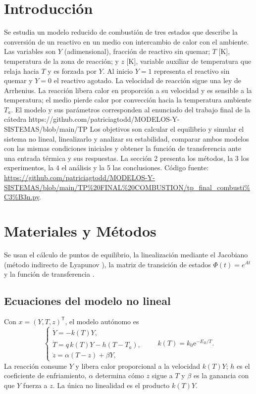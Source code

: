 \documentclass[11pt,a4paper]{article}
\newcommand{\e}{\mathrm{e}}
\begin{document}
\section{Introducción}
Se estudia un modelo reducido de combustión de tres estados que describe la conversión de un reactivo en un medio con intercambio de calor con el ambiente. Las variables son $Y$ (adimensional), fracción de reactivo sin quemar; $T$ [K], temperatura de la zona de reacción; y $z$ [K], variable auxiliar de temperatura que relaja hacia $T$ y es forzada por $Y$. Al inicio $Y=1$ representa el reactivo sin quemar y $Y=0$ el reactivo agotado.
La velocidad de reacción sigue una ley de Arrhenius. La reacción libera calor en proporción a su velocidad y es sensible a la temperatura; el medio pierde calor por convección hacia la temperatura ambiente $T_a$. El modelo y sus parámetros corresponden al enunciado del trabajo final de la cátedra https://github.com/patriciagtodd/MODELOS-Y-SISTEMAS/blob/main/TP%
Los objetivos son calcular el equilibrio y simular el sistema no lineal, linealizarlo y analizar su estabilidad, comparar ambos modelos con las mismas condiciones iniciales y obtener la función de transferencia ante una entrada térmica y sus respuestas. La sección 2 presenta los métodos, la 3 los experimentos, la 4 el análisis y la 5 las conclusiones. Código fuente: \url{https://github.com/patriciagtodd/MODELOS-Y-SISTEMAS/blob/main/TP\%20FINAL\%20COMBUSTION/tp_final_combusti\%C3\%B3n.py}.
\section{Materiales y Métodos}
Se usan el cálculo de puntos de equilibrio, la linealización mediante el Jacobiano (método indirecto de Lyapunov \cite{Khalil}), la matriz de transición de estados $\Phi(t)=e^{At}$ y la función de transferencia \cite{Ogata}.
\subsection{Ecuaciones del modelo no lineal}
Con $x=(Y,T,z)^\mathsf{T}$, el modelo autónomo es
\begin{equation}\label{eq:system}
\begin{cases}
\dot{Y}=-k(T)Y,\\
\dot{T}=q\,k(T)Y-h(T-T_a),\\
\dot{z}=\alpha(T-z)+\beta Y,
\end{cases}
\qquad k(T)=k_0\e^{-E_R/T}.
\end{equation}
La reacción consume $Y$ y libera calor proporcional a la velocidad $k(T)Y$; $h$ es el coeficiente de enfriamiento, $\alpha$ determina cómo $z$ sigue a $T$ y $\beta$ es la ganancia con que $Y$ fuerza a $z$. La única no linealidad es el producto $k(T)Y$.
\end{document}

